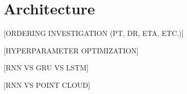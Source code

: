 \section{Architecture}\label{sec:architecture}

[ORDERING INVESTIGATION (PT, DR, ETA, ETC.)]

[HYPERPARAMETER OPTIMIZATION]

[RNN VS GRU VS LSTM]

[RNN VS POINT CLOUD]